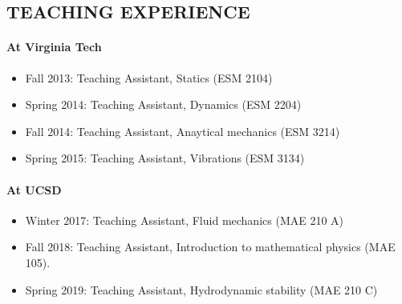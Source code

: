 \documentclass[10pt]{res} %
\begin{document}
\begin{resume}
\vspace*{0.1  in}

\section{{TEACHING EXPERIENCE}}
\paragraph{At Virginia Tech} 
\begin{itemize}
	\vspace*{2mm}
	\item Fall 2013: Teaching Assistant, Statics  (ESM 2104)
	\item Spring 2014: Teaching Assistant, Dynamics (ESM 2204)
	\item Fall 2014: Teaching Assistant, Anaytical mechanics (ESM 3214)
	\item Spring 2015: Teaching Assistant, Vibrations (ESM 3134)
\end{itemize}

\paragraph{At UCSD} 
\begin{itemize}
    \vspace*{2mm}
	\item Winter 2017: Teaching Assistant, Fluid mechanics (MAE 210 A)
	\item Fall   2018: Teaching Assistant, Introduction to mathematical physics (MAE 105).
	\item Spring 2019: Teaching Assistant, Hydrodynamic stability (MAE 210 C)
\end{itemize}

\vspace*{0.1 in}







\end{resume}
\end{document}
